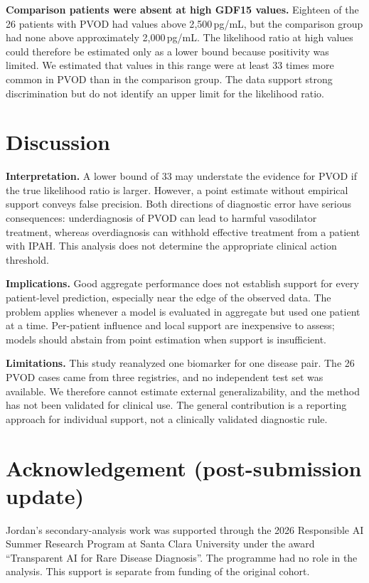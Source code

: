 \documentclass{article}
\begin{document}
\textbf{Comparison patients were absent at high GDF15 values.} Eighteen of the 26
patients with PVOD had values above 2{,}500\,pg/mL, but the comparison group had none
above approximately 2{,}000\,pg/mL. The likelihood ratio at high values could therefore
be estimated only as a lower bound because positivity was limited. We estimated that
values in this range were at least 33 times more common in PVOD than in the comparison
group. The data support strong discrimination but do not identify an upper limit for the
likelihood ratio.

\section{Discussion}

\textbf{Interpretation.} A lower bound of 33 may understate the evidence for PVOD if the
true likelihood ratio is larger. However, a point estimate without empirical support
conveys false precision. Both directions of diagnostic error have serious consequences:
underdiagnosis of PVOD can lead to harmful vasodilator treatment, whereas overdiagnosis
can withhold effective treatment from a patient with IPAH. This analysis does not
determine the appropriate clinical action threshold.

\textbf{Implications.} Good aggregate performance does not establish support for every
patient-level prediction, especially near the edge of the observed data. The problem
applies whenever a model is evaluated in aggregate but used one patient at a time.
Per-patient influence and local support are inexpensive to assess; models should abstain
from point estimation when support is insufficient.

\textbf{Limitations.} This study reanalyzed one biomarker for one disease pair. The 26
PVOD cases came from three registries, and no independent test set was available. We
therefore cannot estimate external generalizability, and the method has not been
validated for clinical use. The general contribution is a reporting approach for
individual support, not a clinically validated diagnostic rule.

\section*{Acknowledgement (post-submission update)}
Jordan's secondary-analysis work was supported through the 2026 Responsible AI Summer
Research Program at Santa Clara University under the award ``Transparent AI for Rare
Disease Diagnosis''. The programme had no role in the analysis. This support is separate
from funding of the original cohort.
\end{document}

